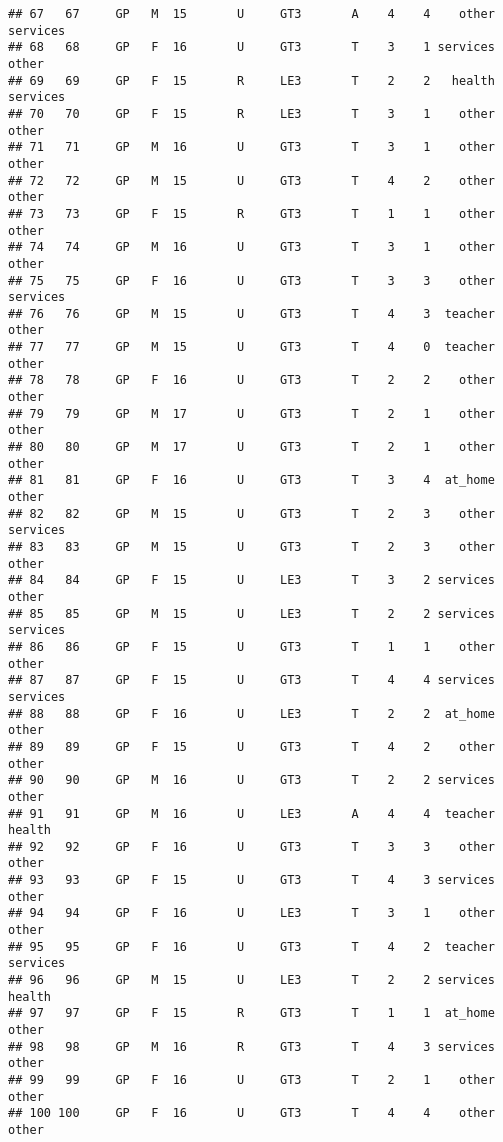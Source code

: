 \documentclass[]{article}
\begin{document}
\begin{verbatim}
## 67   67     GP   M  15       U     GT3       A    4    4    other services
## 68   68     GP   F  16       U     GT3       T    3    1 services    other
## 69   69     GP   F  15       R     LE3       T    2    2   health services
## 70   70     GP   F  15       R     LE3       T    3    1    other    other
## 71   71     GP   M  16       U     GT3       T    3    1    other    other
## 72   72     GP   M  15       U     GT3       T    4    2    other    other
## 73   73     GP   F  15       R     GT3       T    1    1    other    other
## 74   74     GP   M  16       U     GT3       T    3    1    other    other
## 75   75     GP   F  16       U     GT3       T    3    3    other services
## 76   76     GP   M  15       U     GT3       T    4    3  teacher    other
## 77   77     GP   M  15       U     GT3       T    4    0  teacher    other
## 78   78     GP   F  16       U     GT3       T    2    2    other    other
## 79   79     GP   M  17       U     GT3       T    2    1    other    other
## 80   80     GP   M  17       U     GT3       T    2    1    other    other
## 81   81     GP   F  16       U     GT3       T    3    4  at_home    other
## 82   82     GP   M  15       U     GT3       T    2    3    other services
## 83   83     GP   M  15       U     GT3       T    2    3    other    other
## 84   84     GP   F  15       U     LE3       T    3    2 services    other
## 85   85     GP   M  15       U     LE3       T    2    2 services services
## 86   86     GP   F  15       U     GT3       T    1    1    other    other
## 87   87     GP   F  15       U     GT3       T    4    4 services services
## 88   88     GP   F  16       U     LE3       T    2    2  at_home    other
## 89   89     GP   F  15       U     GT3       T    4    2    other    other
## 90   90     GP   M  16       U     GT3       T    2    2 services    other
## 91   91     GP   M  16       U     LE3       A    4    4  teacher   health
## 92   92     GP   F  16       U     GT3       T    3    3    other    other
## 93   93     GP   F  15       U     GT3       T    4    3 services    other
## 94   94     GP   F  16       U     LE3       T    3    1    other    other
## 95   95     GP   F  16       U     GT3       T    4    2  teacher services
## 96   96     GP   M  15       U     LE3       T    2    2 services   health
## 97   97     GP   F  15       R     GT3       T    1    1  at_home    other
## 98   98     GP   M  16       R     GT3       T    4    3 services    other
## 99   99     GP   F  16       U     GT3       T    2    1    other    other
## 100 100     GP   F  16       U     GT3       T    4    4    other    other

\end{verbatim}
\end{document}
